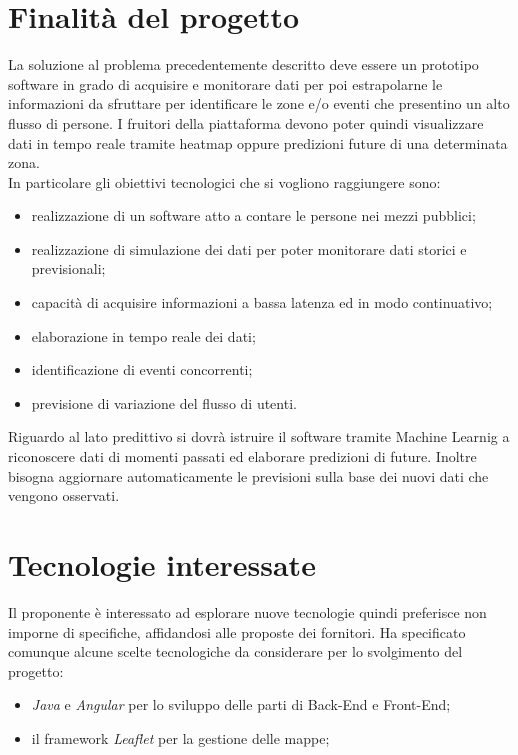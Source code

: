 \section{Finalità del progetto}
La soluzione al problema precedentemente descritto deve essere un prototipo software in grado di acquisire e monitorare dati per poi estrapolarne le informazioni da sfruttare per identificare le zone e/o  eventi che presentino un alto flusso di persone. I fruitori della piattaforma devono poter quindi visualizzare dati in tempo reale tramite heatmap oppure predizioni future di una determinata zona. \\
In particolare gli obiettivi tecnologici che si vogliono raggiungere sono:
\begin{itemize}
	\item realizzazione di un software atto a contare le persone nei mezzi pubblici;
	\item realizzazione di simulazione dei dati per poter monitorare dati storici e previsionali;
	\item capacità di acquisire informazioni a bassa latenza ed in modo continuativo;
	\item elaborazione in tempo reale dei dati;
	\item identificazione di eventi concorrenti;
	\item previsione di variazione del flusso di utenti.
\end{itemize}
Riguardo al lato predittivo si dovrà istruire il software tramite Machine Learnig a riconoscere dati di momenti passati ed elaborare predizioni di future. Inoltre bisogna aggiornare automaticamente le previsioni sulla base dei nuovi dati che vengono osservati.
\section{Tecnologie interessate}
Il proponente è interessato ad esplorare nuove tecnologie quindi preferisce non imporne di specifiche, affidandosi alle proposte dei fornitori. Ha specificato comunque alcune scelte tecnologiche da considerare per lo svolgimento del progetto:
\begin{itemize}
	\item \textit{Java} e \textit{Angular} per lo sviluppo delle parti di Back-End e Front-End;
	\item il framework \textit{Leaflet} per la gestione delle mappe;
\end{itemize}
